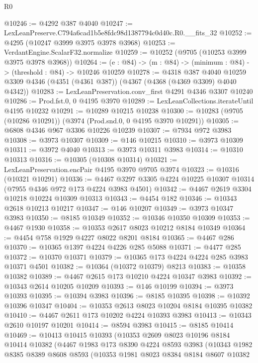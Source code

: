 \begin{lexlean}{R0}
\begin{coremodule}
@10246 := @4292 @387 @4040
@10247 := LexLeanPreserve.C794a6cad1b5e8fdc98d1387794c0d40c.R0.__fits_32
@10252 := @4295 (@10247 @3999 @3975 @3978 @3968)
@10253 := VerdantEngine.ScalarF32.normalize
@10259 := @10252 (@9705 (@10253 @3999 @3975 @3978 @3968))
@10264 := (e : @84) -> (m : @84) -> (minimum : @84) -> (threshold : @84) -> @10246 @10259
@10278 := @4318
    @387
    @4040
    @10259
    @3309
    @4346
    (@4351 (@4361 @387))
    (@4367 (@4368 (@4369 @3309) @4040 @4342))
@10283 := LexLeanPreservation.conv_first @4291 @4346 @3307 @10240
@10286 := Prod.fst.{0, 0} @4195 @3970
@10289 := LexLeanCollections.iterateUntil @4195 @10232
@10291 := @10289 @10215 @10238
@10300 := @10283 (@9705 (@10286 @10291)) (@3974 (Prod.snd.{0, 0} @4195 @3970 @10291))
@10305 := @6808 @4346 @967 @3306 @10226 @10239
@10307 := @7934 @972 @3983
@10308 := @3973 @10307
@10309 := @146 @10215
@10310 := @3973 @10309
@10311 := @3972 @4040
@10313 := @3973 @10311 @3983
@10314 := @10310 @10313
@10316 := @10305 (@10308 @10314)
@10321 := LexLeanPreservation.encPair @4195 @3970 @9705 @3974
@10323 := @10316 (@10321 @10291)
@10336 := @4467 @3297 @3305 @4224 @10225 @10307 @10314 (@7955 @4346 @972 @173 @4224 @3983 @4501)
@10342 := @4467 @2619 @3304 @10218 @10224 @10309 @10313
@10343 := @4454 @182
@10346 := @10343 @2618 @10213 @10217
@10347 := @146 @10207
@10349 := @3973 @10347 @3983
@10350 := @8185 @10349
@10352 := @10346 @10350 @10309
@10353 := @4467 @1930
@10358 := @10353 @2617 @8023 @10212 @8184 @10349
@10364 := @4454 @758 @1929 @4227 @8022 @8201 @8184
@10365 := @4467 @286
@10370 := @10365 @1397 @4224 @4226 @285 @5088
@10371 := @4477 @285
@10372 := @10370 @10371
@10379 := @10365 @173 @4224 @4224 @285 @3983 @10371 @4501
@10382 := @10364 (@10372 @10379) @8213
@10383 := @10358 @10382
@10389 := @4467 @2615 @173 @10210 @4224 @10347 @3983
@10392 := @10343 @2614 @10205 @10209
@10393 := @146 @10199
@10394 := @3973 @10393
@10395 := @10394 @3983
@10396 := @8185 @10395
@10398 := @10392 @10396 @10347
@10404 := @10353 @2613 @8023 @10204 @8184 @10395 @10382
@10410 := @4467 @2611 @173 @10202 @4224 @10393 @3983
@10413 := @10343 @2610 @10197 @10201
@10414 := @8594 @3983
@10415 := @8185 @10414
@10469 := @10413
    @10415
    @10393
    (@10353
      @2609
      @8023
      @10196
      @8184
      @10414
      @10382
      (@4467
        @1983
        @173
        @8390
        @4224
        @8593
        @3983
        (@10343
          @1982
          @8385
          @8389
          @8608
          @8593
          (@10353
            @1981
            @8023
            @8384
            @8184
            @8607
            @10382

\end{coremodule}
\end{lexlean}
